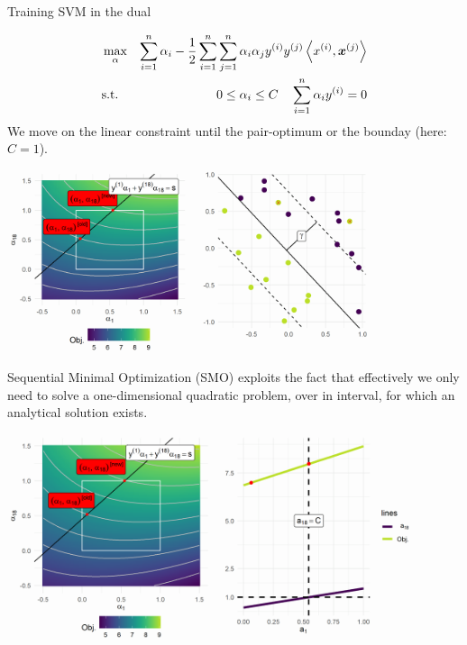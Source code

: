\begin{vbframe}{Training SVM in the dual}
\vspace{-0.5cm}
\begin{footnotesize}  
\begin{eqnarray*}
    & \max_{\alpha} & \sum_{i=1}^n \alpha_i - \frac{1}{2}\sum_{i=1}^n\sum_{j=1}^n\alpha_i\alpha_jy^{(i)} y^{(j)} \left\langle x^{(i)}, \bm{x}^{(j)} \right\rangle  \\
    & \text{s.t. } & 0 \le \alpha_i \le C \quad \sum_{i=1}^n \alpha_i y^{(i)} = 0
\end{eqnarray*}
We move on the linear constraint until the pair-optimum or the bounday (here: $C=1$).
\end{footnotesize}  

\vspace{0.1cm}

\begin{center}
\includegraphics[width = 0.8\textwidth]{figure/svm_training_02.png} \\
\end{center}

    
\framebreak    
Sequential Minimal Optimization (SMO) exploits the fact that effectively 
we only need to solve a one-dimensional quadratic problem, over in interval, 
for which an analytical solution exists.
    
\vspace{0.2cm}    
\begin{center}
\includegraphics[width = 0.9\textwidth]{figure/svm_training_03.png} \\
\end{center}


\end{vbframe}



\endlecture


